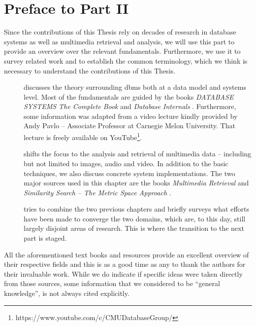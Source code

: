 \chapter*{Preface to Part II}

Since the contributions of this Thesis rely on decades of research in database systems as well as multimedia retrieval and analysis, we will use this part to provide an overview over the relevant fundamentals. Furthermore, we use it to survey related work and to establish the common terminology, which we think is necessary to understand the contributions of this Thesis.

\begin{description}
    \item[]  discusses the theory surrounding \acrlong{dbms} both at a data model and systems level. Most of the fundamentals are guided by the books \emph{DATABASE SYSTEMS The Complete Book} \cite{Garcia:2009Database} and \emph{Database Internals} \cite{Petrov:2019Database}. Furthermore, some information was adapted from a video lecture kindly provided by Andy Pavlo -- Associate Professor at Carnegie Melon University. That lecture is freely available on YouTube\footnote{https://www.youtube.com/c/CMUDatabaseGroup/}.
    \item[] shifts the focus to the analysis and retrieval of multimedia data -- including but not limited to images, audio and video. In addition to the basic techniques, we also discuss concrete system implementations. The two major sources used in this chapter are the books \emph{Multimedia Retrieval} \cite{Blanken:2007multimedia} and \emph{Similarity Search -- The Metric Space Approach} \cite{Zezula:2006Similarity}.
    \item[] tries to combine the two previous chapters and briefly surveys what efforts have been made to converge the two domains, which are, to this day, still largely disjoint areas of research. This is where the transition to the next part is staged.
\end{description}

All the aforementioned text books and resources provide an excellent overview of their respective fields and this is as a good time as any to thank the authors for their invaluable work. While we do indicate if specific ideas were taken directly from those sources, some information that we considered to be ``general knowledge'', is not always cited explicitly.